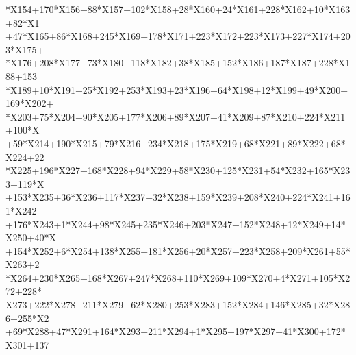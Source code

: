 \begin{tabbing}
*X154+170*X156+88*X157+102*X158+28*X160+24*X161+228*X162+10*X163+82*X1\\[0pt]
+47*X165+86*X168+245*X169+178*X171+223*X172+223*X173+227*X174+203*X175+\\[0pt]
*X176+208*X177+73*X180+118*X182+38*X185+152*X186+187*X187+228*X188+153\\[0pt]
\>*X189+10*X191+25*X192+253*X193+23*X196+64*X198+12*X199+49*X200+169*X202+\\[0pt]
*X203+75*X204+90*X205+177*X206+89*X207+41*X209+87*X210+224*X211+100*X\\[0pt]
+59*X214+190*X215+79*X216+234*X218+175*X219+68*X221+89*X222+68*X224+22\\[0pt]
*X225+196*X227+168*X228+94*X229+58*X230+125*X231+54*X232+165*X233+119*X\\[0pt]
+153*X235+36*X236+117*X237+32*X238+159*X239+208*X240+224*X241+161*X242\\[0pt]
\>+176*X243+1*X244+98*X245+235*X246+203*X247+152*X248+12*X249+14*X250+40*X\\[0pt]
+154*X252+6*X254+138*X255+181*X256+20*X257+223*X258+209*X261+55*X263+2\\[0pt]
*X264+230*X265+168*X267+247*X268+110*X269+109*X270+4*X271+105*X272+228*\\[0pt]
\>X273+222*X278+211*X279+62*X280+253*X283+152*X284+146*X285+32*X286+255*X2\\[0pt]
+69*X288+47*X291+164*X293+211*X294+1*X295+197*X297+41*X300+172*X301+137\\[0pt]

\end{tabbing}
